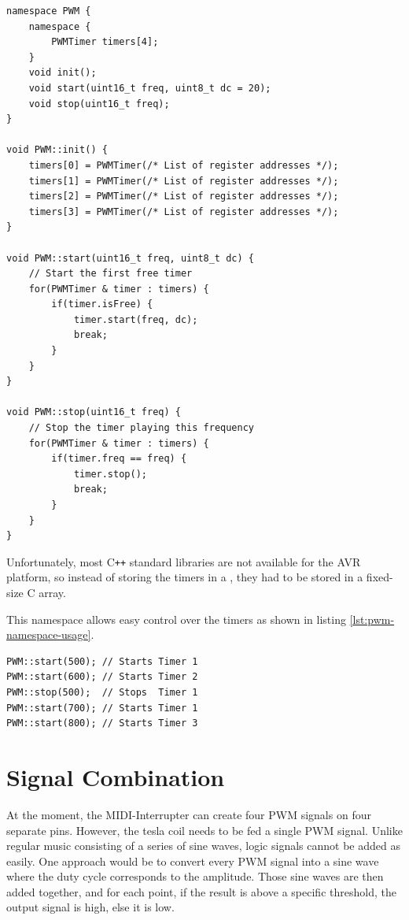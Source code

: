 \begin{lstlisting}[caption=PWM namespace, label=lst:pwm-namespace]
namespace PWM {
	namespace {
		PWMTimer timers[4];
	}
	void init();
	void start(uint16_t freq, uint8_t dc = 20);
	void stop(uint16_t freq);
}

void PWM::init() {
    timers[0] = PWMTimer(/* List of register addresses */);
	timers[1] = PWMTimer(/* List of register addresses */);
	timers[2] = PWMTimer(/* List of register addresses */);
	timers[3] = PWMTimer(/* List of register addresses */);
}

void PWM::start(uint16_t freq, uint8_t dc) {
    // Start the first free timer
    for(PWMTimer & timer : timers) {
        if(timer.isFree) {
            timer.start(freq, dc);
            break;
        }
    }
}

void PWM::stop(uint16_t freq) {
    // Stop the timer playing this frequency
    for(PWMTimer & timer : timers) {
        if(timer.freq == freq) {
            timer.stop();
            break;
        }
    }
}
\end{lstlisting}

Unfortunately, most C\texttt{++} standard libraries are not available for the AVR platform, so instead of storing the timers in a , they had to be stored in a fixed-size C array.

This namespace allows easy control over the timers as shown in listing \ref{lst:pwm-namespace-usage}.

\begin{lstlisting}[caption=PWM namespace usage, label=lst:pwm-namespace-usage]
PWM::start(500); // Starts Timer 1
PWM::start(600); // Starts Timer 2
PWM::stop(500);  // Stops  Timer 1
PWM::start(700); // Starts Timer 1
PWM::start(800); // Starts Timer 3
\end{lstlisting}

\section{Signal Combination}
\label{sec:signal-combination}


At the moment, the MIDI-Interrupter can create four PWM signals on four separate pins. However, the tesla coil needs to be fed a single PWM signal. Unlike regular music consisting of a series of sine waves, logic signals cannot be added as easily. One approach would be to convert every PWM signal into a sine wave where the duty cycle corresponds to the amplitude. Those sine waves are then added together, and for each point, if the result is above a specific threshold, the output signal is high, else it is low.

